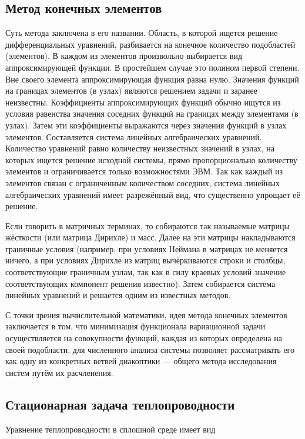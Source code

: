 \documentclass[a4paper, 14pt]{extarticle}
\begin{document}
\subsection{Метод конечных элементов}

Суть метода заключена в его названии. Область, в которой ищется решение
дифференциальных уравнений, разбивается на конечное количество подобластей
(элементов). В каждом из элементов произвольно выбирается вид аппроксимирующей
функции. В простейшем случае это полином первой степени. Вне своего элемента
аппроксимирующая функция равна нулю. Значения функций на границах элементов (в
узлах) являются решением задачи и заранее неизвестны. Коэффициенты
аппроксимирующих функций обычно ищутся из условия равенства значения соседних
функций на границах между элементами (в узлах). Затем эти коэффициенты
выражаются через значения функций в узлах элементов. Составляется система
линейных алгебраических уравнений. Количество уравнений равно количеству
неизвестных значений в узлах, на которых ищется решение исходной системы, прямо
пропорционально количеству элементов и ограничивается только возможностями ЭВМ.
Так как каждый из элементов связан с ограниченным количеством соседних, система
линейных алгебраических уравнений имеет разрежённый вид, что существенно
упрощает её решение.

Если говорить в матричных терминах, то собираются так называемые матрицы
жёсткости (или матрица Дирихле) и масс. Далее на эти матрицы накладываются
граничные условия (например, при условиях Неймана в матрицах не меняется ничего,
а при условиях Дирихле из матриц вычёркиваются строки и столбцы, соответствующие
граничным узлам, так как в силу краевых условий значение соответствующих
компонент решения известно). Затем собирается система линейных уравнений и
решается одним из известных методов.

С точки зрения вычислительной математики, идея метода конечных элементов
заключается в том, что минимизация функционала вариационной задачи
осуществляется на совокупности функций, каждая из которых определена на своей
подобласти, для численного анализа системы позволяет рассматривать его как одну
из конкретных ветвей диакоптики — общего метода исследования систем путём их
расчленения.

\subsection{Стационарная задача теплопроводности}

Уравнение теплопроводности в сплошной среде имеет вид
\end{document}
